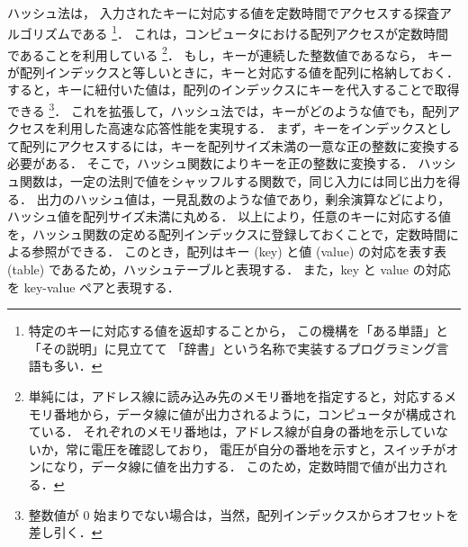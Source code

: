 \thispagestyle{empty} %

　\\
\\
\\
\\
\\
\\
\\
\\

ハッシュ法は，
入力されたキーに対応する値を定数時間でアクセスする探査アルゴリズムである
\footnote{
特定のキーに対応する値を返却することから，
この機構を「ある単語」と「その説明」に見立てて
「辞書」という名称で実装するプログラミング言語も多い．
}．
これは，コンピュータにおける配列アクセスが定数時間であることを利用している
\footnote{
単純には，アドレス線に読み込み先のメモリ番地を指定すると，対応するメモリ番地から，データ線に値が出力されるように，コンピュータが構成されている．
それぞれのメモリ番地は，アドレス線が自身の番地を示していないか，常に電圧を確認しており，
電圧が自分の番地を示すと，スイッチがオンになり，データ線に値を出力する．
このため，定数時間で値が出力される．
}．
もし，キーが連続した整数値であるなら，
キーが配列インデックスと等しいときに，キーと対応する値を配列に格納しておく．
すると，キーに紐付いた値は，配列のインデックスにキーを代入することで取得できる
\footnote{
整数値が 0 始まりでない場合は，当然，配列インデックスからオフセットを差し引く．
}．
これを拡張して，ハッシュ法では，キーがどのような値でも，配列アクセスを利用した高速な応答性能を実現する．
まず，キーをインデックスとして配列にアクセスするには，キーを配列サイズ未満の一意な正の整数に変換する必要がある．
そこで，ハッシュ関数によりキーを正の整数に変換する．
ハッシュ関数は，一定の法則で値をシャッフルする関数で，同じ入力には同じ出力を得る．
出力のハッシュ値は，一見乱数のような値であり，剰余演算などにより，ハッシュ値を配列サイズ未満に丸める．
以上により，任意のキーに対応する値を，ハッシュ関数の定める配列インデックスに登録しておくことで，定数時間による参照ができる．
このとき，配列はキー (key) と値 (value) の対応を表す表 (table) であるため，ハッシュテーブルと表現する．
また，key と value の対応を key-value ペアと表現する．

